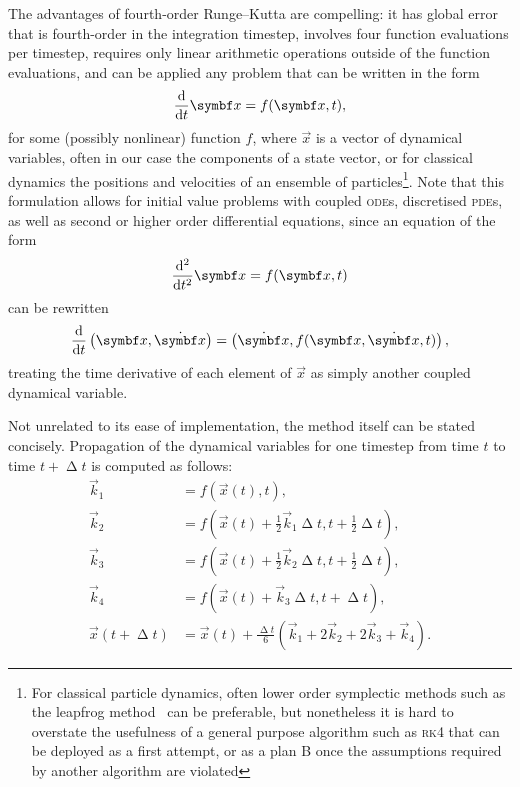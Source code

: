The advantages of fourth-order Runge--Kutta are compelling: it has global error that is fourth-order in the integration timestep, involves four function evaluations per timestep, requires only linear arithmetic operations outside of the function evaluations, and can be applied any problem that can be written in the form
\begin{align}
\dv t \vec x = f(\vec x, t),
\end{align}
for some (possibly nonlinear) function $f$, where $\vec{x}$ is a vector of dynamical variables, often in our case the components of a state vector, or for classical dynamics the positions and velocities of an ensemble of particles\footnote{For classical particle dynamics, often lower order symplectic methods such as the leapfrog method~\cite{Skeel97afamily} can be preferable, but nonetheless it is hard to overstate the usefulness of a general purpose algorithm such as \textsc{rk4} that can be deployed as a first attempt, or as a plan B once the assumptions required by another algorithm are violated}. Note that this formulation allows for initial value problems with coupled \textsc{ode}s, discretised \textsc{pde}s, as well as second or higher order differential equations, since an equation of the form
\begin{align}
\dv[2] t \vec x = f(\vec x, t)
\end{align}
can be rewritten
\begin{align}
\dv t \left(\vec x, \dot{\vec x}\right) = \left(\dot{\vec x}, f(\vec x, \dot{\vec x}, t)\right),
\end{align}
treating the time derivative of each element of $\vec x$ as simply another coupled dynamical variable.

Not unrelated to its ease of implementation, the method itself can be stated concisely. Propagation of the dynamical variables for one timestep from time $t$ to time $t + \upDelta t$ is computed as follows:
\begin{align}
\vec k_1 &= f(\vec x(t), t),\nonumber\\
\vec k_2 &= f(\vec x(t) + \tfrac12 \vec k_1\upDelta t, t + \tfrac12\upDelta t),\nonumber\\
\vec k_3 &= f(\vec x(t) + \tfrac12 \vec k_2\upDelta t, t + \tfrac12\upDelta t),\nonumber\\
\vec k_4 &= f(\vec x(t) + \vec k_3\upDelta t, t + \upDelta t),\nonumber\\
\vec x(t + \upDelta t) &= \vec x(t)
+ \tfrac{\upDelta t}6(\vec k_1 + 2\vec k_2 + 2\vec k_3 + \vec k_4).\label{eq:rk4}
\end{align}

